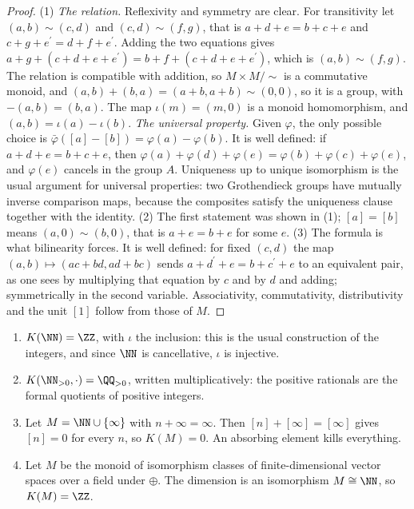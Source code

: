 \begin{proof}
(1) \emph{The relation.} Reflexivity and symmetry are clear. For transitivity let $(a, b) \sim (c, d)$ and $(c, d) \sim (f, g)$, that is $a + d + e = b + c + e$ and $c + g + e^{\prime} = d + f + e^{\prime}$.
Adding the two equations gives $a + g + (c + d + e + e^{\prime}) = b + f + (c + d + e + e^{\prime})$, which is $(a, b) \sim (f, g)$. The relation is compatible with addition, so $M \times M/{\sim}$ is a
commutative monoid, and $(a, b) + (b, a) = (a + b, a + b) \sim (0, 0)$, so it is a group, with $-(a, b) = (b, a)$. The map $\iota(m) = (m, 0)$ is a monoid homomorphism, and $(a, b) = \iota(a) - \iota(b)$.
\emph{The universal property.} Given $\varphi$, the only possible choice is $\bar{\varphi}([a] - [b]) = \varphi(a) - \varphi(b)$. It is well defined: if $a + d + e = b + c + e$, then
$\varphi(a) + \varphi(d) + \varphi(e) = \varphi(b) + \varphi(c) + \varphi(e)$, and $\varphi(e)$ cancels in the group $A$. Uniqueness up to unique isomorphism is the usual argument for universal
properties: two Grothendieck groups have mutually inverse comparison maps, because the composites satisfy the uniqueness clause together with the identity.
(2) The first statement was shown in (1); $[a] = [b]$ means $(a, 0) \sim (b, 0)$, that is $a + e = b + e$ for some $e$.
(3) The formula is what bilinearity forces. It is well defined: for fixed $(c, d)$ the map $(a, b) \mapsto (ac + bd, ad + bc)$ sends $a + d^{\prime} + e = b + c^{\prime} + e$ to an equivalent pair,
as one sees by multiplying that equation by $c$ and by $d$ and adding; symmetrically in the second variable. Associativity, commutativity, distributivity and the unit $[1]$ follow from those of $M$.
\end{proof}

\begin{example}\label{k-theory:example-grothendieck-groups}
\begin{enumerate}
\item $K(\NN) = \ZZ$, with $\iota$ the inclusion: this is the usual construction of the integers, and since $\NN$ is cancellative, $\iota$ is injective.
\item $K(\NN_{> 0}, \cdot) = \QQ_{> 0}$, written multiplicatively: the positive rationals are the formal quotients of positive integers.
\item Let $M = \NN \cup \{\infty\}$ with $n + \infty = \infty$. Then $[n] + [\infty] = [\infty]$ gives $[n] = 0$ for every $n$, so $K(M) = 0$. An absorbing element kills everything.
\item Let $M$ be the monoid of isomorphism classes of finite-dimensional vector spaces over a field under $\oplus$. The dimension is an isomorphism $M \cong \NN$, so $K(M) = \ZZ$.
\end{enumerate}
\end{example}

